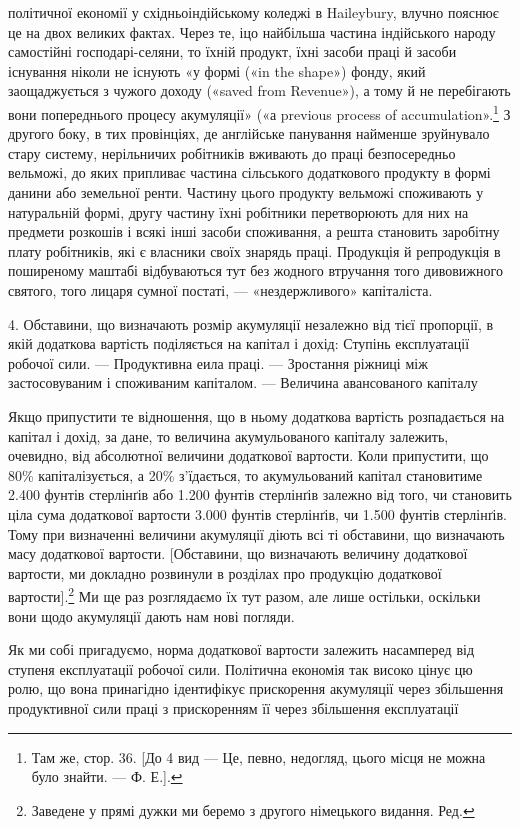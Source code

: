 \parcont{}  %
політичної економії у східньоіндійському коледжі в Haileybury,
влучно пояснює це на двох великих фактах. Через те, іцо
найбільша частина індійського народу самостійні господарі-селяни,
то їхній продукт, їхні засоби праці й засоби існування
ніколи не існують «у формі («in the shape») фонду, який заощаджується
з чужого доходу («saved from Revenue»), а тому
й не перебігають вони попереднього процесу акумуляції» («а
previous process of accumulation».\footnote{
Там же, стор. 36. [До 4 вид — Це, певно, недогляд, цього місця
не можна було знайти. — Ф. Е.].
} З другого боку, в тих провінціях,
де англійське панування найменше зруйнувало стару
систему, нерільничих робітників вживають до праці безпосередньо
вельможі, до яких припливає частина сільського додаткового продукту
в формі данини або земельної ренти. Частину цього продукту
вельможі споживають у натуральній формі, другу частину
їхні робітники перетворюють для них на предмети розкошів
і всякі інші засоби споживання, а решта становить заробітну
плату робітників, які є власники своїх знарядь праці. Продукція
й репродукція в поширеному маштабі відбуваються тут без
жодного втручання того дивовижного святого, того лицаря сумної
постаті, — «нездержливого» капіталіста.

4. Обставини, що визначають розмір акумуляції незалежно від
тієї пропорції, в якій додаткова вартість поділяється на капітал
і дохід: Ступінь експлуатації робочої сили. — Продуктивна
еила праці. — Зростання ріжниці між застосовуваним і споживаним
капіталом. — Величина авансованого капіталу

Якщо припустити те відношення, що в ньому додаткова вартість
розпадається на капітал і дохід, за дане, то величина акумульованого
капіталу залежить, очевидно, від абсолютної величини
додаткової вартости. Коли припустити, що 80\% капіталізується,
а 20\% з’їдається, то акумульований капітал становитиме
2.400 фунтів стерлінґів або 1.200 фунтів стерлінґів залежно
від того, чи становить ціла сума додаткової вартости 3.000 фунтів
стерлінґів, чи 1.500 фунтів стерлінґів. Тому при визначенні
величини акумуляції діють всі ті обставини, що визначають масу
додаткової вартости. [Обставини, що визначають величину додаткової
вартости, ми докладно розвинули в розділах про продукцію
додаткової вартости].\footnote*{
Заведене у прямі дужки ми беремо з другого німецького видання.
Ред.
} Ми ще раз розглядаємо їх тут
разом, але лише остільки, оскільки вони щодо акумуляції дають
нам нові погляди.

Як ми собі пригадуємо, норма додаткової вартости залежить
насамперед від ступеня експлуатації робочої сили. Політична
економія так високо цінує цю ролю, що вона принагідно ідентифікує
прискорення акумуляції через збільшення продуктивної
сили праці з прискоренням її через збільшення експлуатації
\parbreak{}  %
